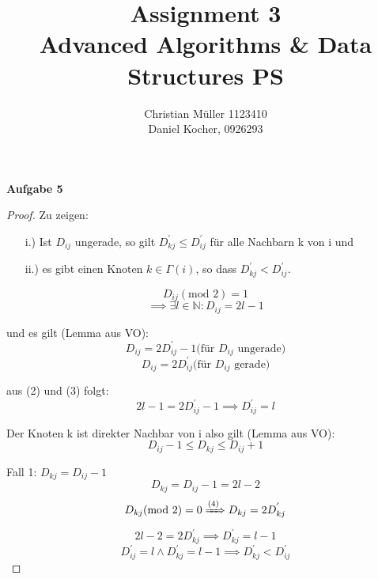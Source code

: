 \documentclass{article}
\begin{document}
\title{Assignment 3 \\ Advanced Algorithms \& Data Structures PS}%
\author{Christian Müller 1123410 \\ Daniel Kocher, 0926293}%
\maketitle

{\noindent\bfseries Aufgabe 5}%
\medskip%
 
\begin{proof}
\noindent
Zu zeigen:
\begin{enumerate}
  \item[i.)] Ist $D_{ij}$ ungerade, so gilt $D^{'}_{kj} \leq D^{'}_{ij}$ für alle Nachbarn k von i und
  \item[ii.)] es gibt einen Knoten $k \in \Gamma(i)$, so dass $D^{'}_{kj} < D^{'}_{ij}$.
\end{enumerate}
\begin{equation}
  D_{ij}(\text{mod } 2) = 1
\end{equation}
\begin{equation}
  \implies \exists l \in \mathbb{N}: D_{ij} = 2l - 1
\end{equation}

\noindent
und es gilt (Lemma aus VO):
\begin{equation}
  D_{ij} = 2D^{'}_{ij} - 1 \text{(f{\"u}r $D_{ij}$ ungerade)}
\end{equation}
\begin{equation}
  D_{ij} = 2D^{'}_{ij} \text{(f{\"u}r $D_{ij}$ gerade)}
\end{equation}

\noindent
aus (2) und (3) folgt: 
\begin{equation}
  2l-1 = 2D^{'}_{ij}-1 \implies D^{'}_{ij} = l
\end{equation}

\noindent
Der Knoten k ist direkter Nachbar von i also gilt (Lemma aus VO):
\begin{equation}
  D_{ij} - 1 \leq D_{kj} \leq D_{ij} + 1
\end{equation}

\noindent
Fall 1: $D_{kj} = D_{ij} - 1$
\begin{equation}
  D_{kj} = D_{ij} - 1 = 2l - 2
\end{equation}
\begin{equation}
  D_{kj}(\text{mod } 2) = 0 \xRightarrow{(4)} D_{kj}=2D^{'}_{kj}
\end{equation}
\begin{equation}
  2l-2 = 2D^{'}_{kj} \implies D^{'}_{kj}=l-1
\end{equation}
\begin{equation}
  D^{'}_{ij} =l \wedge D^{'}_{kj} =l-1 \implies D^{'}_{kj} < D^{'}_{ij}
\end{equation}


\end{proof}
\end{document}
